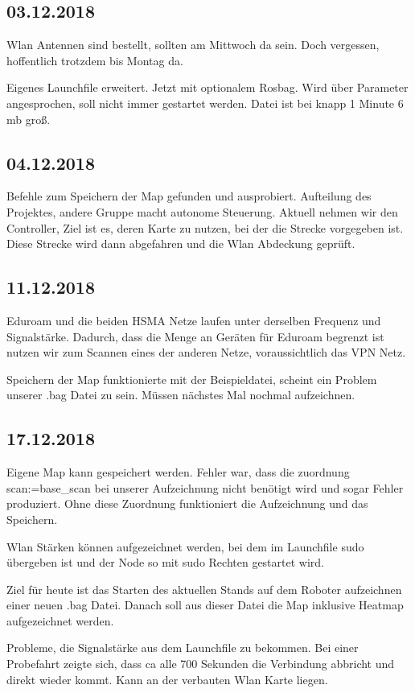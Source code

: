 \documentclass{scrartcl}%
\begin{document}
\subsection{03.12.2018}
Wlan Antennen sind bestellt, sollten am Mittwoch da sein. Doch vergessen, hoffentlich trotzdem bis Montag da.

Eigenes Launchfile erweitert. Jetzt mit optionalem Rosbag. Wird über Parameter angesprochen, soll nicht immer gestartet werden. Datei ist bei knapp 1 Minute 6 mb groß.

\subsection{04.12.2018}
Befehle zum Speichern der Map gefunden und ausprobiert. Aufteilung des Projektes, andere Gruppe macht autonome Steuerung. Aktuell nehmen wir den Controller, Ziel ist es, deren Karte zu nutzen, bei der die Strecke vorgegeben ist. Diese Strecke wird dann abgefahren und die Wlan Abdeckung geprüft.

\subsection{11.12.2018}
Eduroam und die beiden HSMA Netze laufen unter derselben Frequenz und Signalstärke. Dadurch, dass die Menge an Geräten für Eduroam begrenzt ist nutzen wir zum Scannen eines der anderen Netze, voraussichtlich das VPN Netz.

Speichern der Map funktionierte mit der Beispieldatei, scheint ein Problem unserer .bag Datei zu sein. Müssen nächstes Mal nochmal aufzeichnen.

\subsection{17.12.2018}
Eigene Map kann gespeichert werden. Fehler war, dass die zuordnung scan:=base\_scan bei unserer Aufzeichnung nicht benötigt wird und sogar Fehler produziert. Ohne diese Zuordnung funktioniert die Aufzeichnung und das Speichern.

Wlan Stärken können aufgezeichnet werden, bei dem im Launchfile sudo übergeben ist und der Node so mit sudo Rechten gestartet wird.

Ziel für heute ist das Starten des aktuellen Stands auf dem Roboter aufzeichnen einer neuen .bag Datei. Danach soll aus dieser Datei die Map inklusive Heatmap aufgezeichnet werden.

Probleme, die Signalstärke aus dem Launchfile zu bekommen. Bei einer Probefahrt zeigte sich, dass ca alle 700 Sekunden die Verbindung abbricht und direkt wieder kommt. Kann an der verbauten Wlan Karte liegen.
\end{document}
